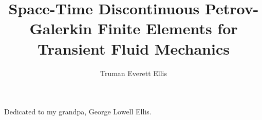 \documentclass[12pt]{report} %
\author{Truman Everett Ellis}  	%
\title{Space-Time Discontinuous Petrov-Galerkin Finite Elements for Transient Fluid Mechanics}
\begin{document}
\copyrightpage          %


%
%
%
\commcertpage           %

\titlepage  %



%
\begin{dedication}
%
Dedicated to my grandpa, George Lowell Ellis.
\end{dedication}
\end{document}
